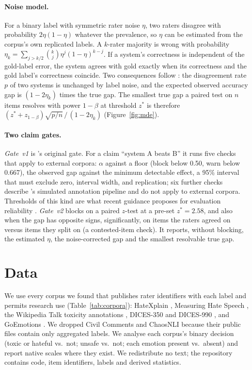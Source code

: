 \documentclass[11pt]{article}
\begin{document}
\paragraph{Noise model.} For a binary label with symmetric rater noise $\eta$, two raters disagree with probability $2\eta(1-\eta)$ whatever the prevalence, so $\eta$ can be estimated from the corpus's own replicated labels. A $k$-rater majority is wrong with probability $\eta_k=\sum_{j>k/2}\binom{k}{j}\eta^j(1-\eta)^{k-j}$. If a system's correctness is independent of the gold-label error, the system agrees with gold exactly when its correctness and the gold label's correctness coincide. Two consequences follow \citep{lam2003evaluating,dorner2024dont}: the disagreement rate $p$ of two systems is unchanged by label noise, and the expected observed accuracy gap is $(1-2\eta_k)$ times the true gap. The smallest true gap a paired test on $n$ items resolves with power $1-\beta$ at threshold $z^\ast$ is therefore $(z^\ast+z_{1-\beta})\sqrt{p/n}\,/\,(1-2\eta_k)$ (Figure~\ref{fig:mde}).

\paragraph{Two claim gates.} \emph{Gate~v1} is \libname's original gate. For a claim ``system A beats B'' it runs five checks that apply to external corpora: $\alpha$ against a floor (block below 0.50, warn below 0.667), the observed gap against the minimum detectable effect, a 95\% interval that must exclude zero, interval width, and replication; six further checks describe \libname's simulated annotation pipeline and do not apply to external corpora. Thresholds of this kind are what recent guidance proposes for evaluation reliability \citep{caban2026measurement}. \emph{Gate~v2} blocks on a paired $z$-test at a pre-set $z^\ast=2.58$, and also when the gap has opposite signs, significantly, on items the raters agreed on versus items they split on (a contested-item check). It reports, without blocking, the estimated $\eta$, the noise-corrected gap and the smallest resolvable true gap.

\section{Data}
\label{sec:data}
We use every corpus we found that publishes rater identifiers with each label and permits research use (Table~\ref{tab:corpora}): HateXplain \citep{mathew2021hatexplain}, Measuring Hate Speech \citep[MHS;][]{kennedy2020measuring,sachdeva2022measuring}, the Wikipedia Talk toxicity annotations \citep{wulczyn2017ex}, DICES-350 and DICES-990 \citep{aroyo2023dices}, and GoEmotions \citep{demszky2020goemotions}. We dropped Civil Comments and ChaosNLI because their public files contain only aggregated labels. We analyse each corpus's binary decision (toxic or hateful vs.\ not; unsafe vs.\ not; each emotion present vs.\ absent) and report native scales where they exist. We redistribute no text; the repository contains code, item identifiers, labels and derived statistics.
\end{document}
